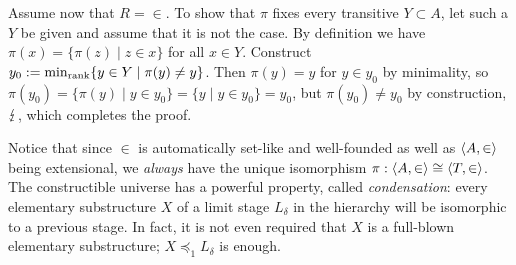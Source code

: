 {Assume now that $R=\in$. To show that $\pi$ fixes every transitive $Y\subset A$, let such a $Y$ be given and assume that it is not the case. By definition we have $\pi(x)=\{\pi(z)\mid z\in x\}$ for all $x\in Y$. Construct $y_0:=\min_{\operatorname{rank}}\{y\in Y\mid\pi(y)\neq y\}$. Then $\pi(y)=y$ for $y\in y_0$ by minimality, so $\pi(y_0)=\{\pi(y)\mid y\in y_0\}=\{y\mid y\in y_0\}=y_0$, but $\pi(y_0)\neq y_0$ by construction, $\operatorname{\lightning}$, which completes the proof.
}

Notice that since $\in$ is automatically set-like and well-founded as well as $\langle A,\in\rangle$ being extensional, we \textit{always} have the unique isomorphism $\pi:\langle A,\in\rangle\cong\langle T,\in\rangle$. The constructible universe has a powerful property, called \textit{condensation}: every elementary substructure $X$ of a limit stage $L_\delta$ in the hierarchy will be isomorphic to a previous stage. In fact, it is not even required that $X$ is a full-blown elementary substructure; $X\preceq_1 L_\delta$ is enough.

